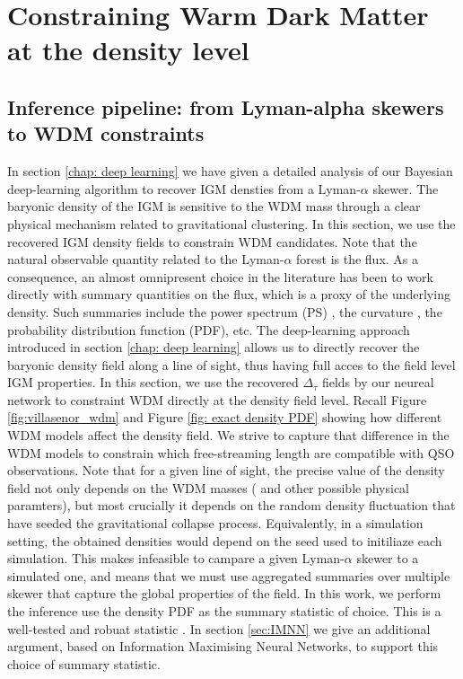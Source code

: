 \chapter{Constraining Warm Dark Matter at the density level}\label{sec: inference pipeline}


\section{Inference pipeline: from Lyman-alpha skewers to WDM constraints}\label{sec: inference algo}

In section \ref{chap: deep learning} we have given a detailed analysis of our Bayesian deep-learning algorithm to recover IGM densties from a Lyman-$\alpha$ skewer. The baryonic density of the IGM is sensitive to the WDM mass through a clear physical mechanism related to gravitational clustering. In this section, we use the recovered IGM density fields to constrain WDM candidates. Note that the natural observable quantity related to the Lyman-$\alpha$ forest is the flux. As a consequence, an almost omnipresent choice in the literature has been to work directly with summary quantities on the flux, which is a proxy of the underlying density. Such summaries include the power spectrum (PS) \cite{Villasenor_2023}, the curvature \cite{Becker_2010}, the probability distribution function (PDF), etc. The deep-learning approach introduced in section \ref{chap: deep learning} allows us to directly recover the baryonic density field along a line of sight, thus having full acces to the field level IGM properties. In this section, we use the recovered $\Delta_\tau$ fields by our neureal network to constraint WDM directly at the density field level. Recall Figure \ref{fig:villasenor_wdm} and Figure \ref{fig: exact density PDF} showing how different WDM models affect the density field. We strive to capture that difference in the WDM models to constrain which free-streaming length are compatible with QSO observations. Note that for a given line of sight, the precise value of the density field not only depends on the WDM masses ( and other possible physical paramters), but most crucially it depends on the random density fluctuation that have seeded the gravitational collapse process. Equivalently, in a simulation setting, the obtained densities would depend on the seed used to initiliaze each simulation. This makes infeasible to campare a given Lyman-$\alpha$ skewer to a simulated one, and means that we must use aggregated summaries over multiple skewer that capture the global properties of the field. In this work, we perform the inference use the density PDF as the summary statistic of choice. This is a well-tested and robuat statistic \cite{Gaikwad_2021}. In section \ref{sec:IMNN} we give an additional argument, based on Information Maximising Neural Networks, to support this choice of summary statistic.


